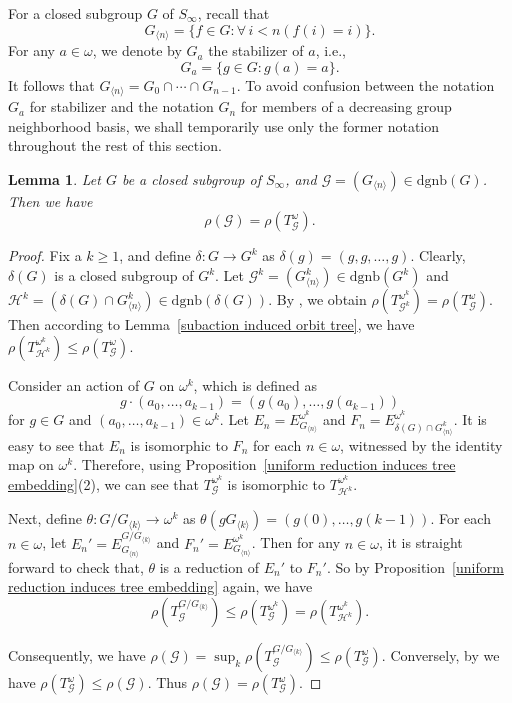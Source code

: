 \documentclass[11pt]{amsart}
\newtheorem{lemma}[theorem]{Lemma}
\theoremstyle{definition}
\theoremstyle{remark}
\numberwithin{equation}{section}
\def\dgnb{{\mathrm{dgnb}}}
\def\gnb#1{G_{\langle #1\rangle}}
\def\otr#1#2{T_{\mathcal{#1}}^{#2}}
\begin{document}
For a closed subgroup $G$ of $S_\infty$, recall that
$$\gnb{n}=\{f\in G:\forall\,i<n\left(f(i)=i\right)\}.$$
For any $a\in\omega$, we denote by $G_a$ the stabilizer of $a$, i.e.,
$$G_a=\{g\in G:g(a)=a\}.$$
It follows that $\gnb{n}=G_0\cap\cdots\cap G_{n-1}$. To avoid confusion between the notation $G_a$ for stabilizer and the notation $G_n$ for members of a decreasing group neighborhood basis, we shall temporarily use only the former notation throughout the rest of this section.
\begin{lemma}\label{another highest orbit tree}
    Let $G$ be a closed subgroup of $S_\infty$, and $\mathcal{G}=(G_{\langle n\rangle})\in\dgnb(G)$. Then we have
    $$\rho(\mathcal{G})=\rho(\otr{G}{\omega}).$$
\end{lemma}
\begin{proof}
Fix a $k\geq 1$, and define $\delta:G\to G^k$ as $\delta(g)=(g,g,\dots,g)$. Clearly, $\delta(G)$ is a closed subgroup of $G^k$. Let $\mathcal{G}^k=(\gnb{n}^k)\in\dgnb(G^k)$ and $\mathcal{H}^k=(\delta(G)\cap\gnb{n}^k)\in\dgnb(\delta(G))$. By \cite[Lemma 4.3]{DingW}, we obtain $\rho(T_{\mathcal{G}^k}^{\omega^k})=\rho(\otr{G}{\omega})$. Then according to Lemma~\ref{subaction induced orbit tree}, we have $\rho(T_{\mathcal{H}^k}^{\omega^{k}})\leq\rho(\otr{G}{\omega})$.

Consider an action of $G$ on $\omega^k$, which is defined as
    $$g\cdot(a_0,\dots,a_{k-1})=(g(a_0),\dots,g(a_{k-1}))$$
    for $g\in G$ and $(a_0,\dots,a_{k-1})\in\omega^k$.
    Let $E_n=E_{G_{\langle n\rangle}}^{\omega^k}$ and $F_n=E_{\delta(G)\cap G_{\langle n\rangle}^k}^{\omega^k}$.
    It is easy to see that $E_n$ is isomorphic to $F_n$ for each $n\in\omega$, witnessed by the identity map on $\omega^k$. Therefore, using Proposition~\ref{uniform reduction induces tree embedding}(2), we can see that $\otr{G}{\omega^k}$ is isomorphic to $T_{\mathcal{H}^k}^{\omega^k}$.

Next, define $\theta:G/G_{\langle k\rangle}\to\omega^k$ as $\theta(gG_{\langle k\rangle})=(g(0),\dots,g(k-1))$. For each $n\in\omega$, let $E_n'=E_{G_{\langle n\rangle}}^{G/G_{\langle k\rangle}}$ and $F_n'=E_{G_{\langle n\rangle}}^{\omega^k}$. Then for any $n\in\omega$, it is straight forward to check that, $\theta$ is a reduction of $E_n'$ to $F_n'$. So by Proposition~\ref{uniform reduction induces tree embedding} again, we have
    $$\rho(T_{\mathcal{G}}^{G/G_{\langle k\rangle}})\leq\rho(T_{\mathcal{G}}^{\omega^k})
    =\rho(T_{\mathcal{H}^k}^{\omega^k}).$$

Consequently, we have $\rho(\mathcal{G})=\sup_k\rho(T_{\mathcal{G}}^{G/G_{\langle k\rangle}})\leq\rho(\otr{G}{\omega})$. Conversely, by \cite[Corollary 3.12]{DingW} we have $\rho(\otr{G}{\omega})\leq\rho(\mathcal{G})$. Thus $\rho(\mathcal{G})=\rho(\otr{G}{\omega})$.
\end{proof}
\end{document}
